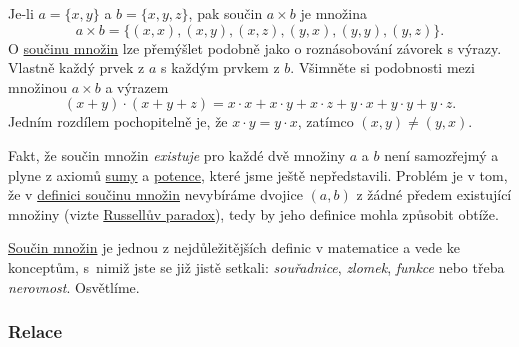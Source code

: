 \begin{example}
  \label{exam:soucin-mnozin}
  Je-li $a = \{x, y\}$ a $b = \{x, y, z\}$, pak součin $a \times b$ je množina
  \[
    a \times b = \{(x, x), (x, y), (x, z), (y, x), (y, y), (y, z)\}.
  \]
  O \hyperref[def:soucin-mnozin]{součinu množin} lze přemýšlet podobně jako o
  roznásobování závorek s výrazy. Vlastně  každý prvek z $a$ s
  každým prvkem z $b$. Všimněte si podobnosti mezi množinou $a \times b$ a
  výrazem
  \[
    (x + y) \cdot (x + y + z) = x \cdot x + x \cdot y + x \cdot z + y \cdot x +
    y \cdot y + y \cdot z.
  \]
  Jedním rozdílem pochopitelně je, že $x \cdot y = y \cdot x$, zatímco $(x, y)
  \neq (y, x)$.
\end{example}
\begin{warning}
  Fakt, že součin množin \emph{existuje} pro každé dvě množiny $a$ a $b$ není
  samozřejmý a plyne z axiomů \hyperref[eq:axiom-sumy]{sumy} a
  \hyperref[eq:axiom-potence]{potence}, které jsme ještě nepředstavili. Problém
  je v tom, že v \hyperref[eq:soucin-mnozin]{definici součinu množin} nevybíráme
  dvojice $(a, b)$ z žádné předem existující množiny (vizte
  \hyperref[exam:russelluv-paradox]{Russellův paradox}), tedy by jeho definice
  mohla způsobit obtíže.
\end{warning}
\hyperref[def:soucin-mnozin]{Součin množin} je jednou z nejdůležitějších definic
v matematice a vede ke konceptům, s~nimiž jste se již jistě setkali:
\emph{souřadnice}, \emph{zlomek}, \emph{funkce} nebo třeba \emph{nerovnost}.
Osvětlíme.

\subsubsection{Relace}
\label{sssec:relace}

